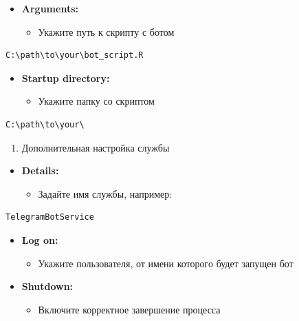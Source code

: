 \documentclass[
]{book}
\providecommand{\tightlist}{%
  \setlength{\itemsep}{0pt}\setlength{\parskip}{0pt}}
\begin{document}
\begin{itemize}
\tightlist
\item
  \textbf{Arguments:}

  \begin{itemize}
  \tightlist
  \item
    Укажите путь к скрипту с ботом
  \end{itemize}
\end{itemize}

\begin{verbatim}
C:\path\to\your\bot_script.R
\end{verbatim}

\begin{itemize}
\tightlist
\item
  \textbf{Startup directory:}

  \begin{itemize}
  \tightlist
  \item
    Укажите папку со скриптом
  \end{itemize}
\end{itemize}

\begin{verbatim}
C:\path\to\your\
\end{verbatim}

\begin{enumerate}
\def\labelenumi{\arabic{enumi}.}
\setcounter{enumi}{3}
\tightlist
\item
  Дополнительная настройка службы
\end{enumerate}

\begin{itemize}
\tightlist
\item
  \textbf{Details:}

  \begin{itemize}
  \tightlist
  \item
    Задайте имя службы, например:
  \end{itemize}
\end{itemize}

\begin{verbatim}
TelegramBotService
\end{verbatim}

\begin{itemize}
\tightlist
\item
  \textbf{Log on:}

  \begin{itemize}
  \tightlist
  \item
    Укажите пользователя, от имени которого будет запущен бот
  \end{itemize}
\item
  \textbf{Shutdown:}

  \begin{itemize}
  \tightlist
  \item
    Включите корректное завершение процесса
  \end{itemize}
\end{itemize}
\end{document}
